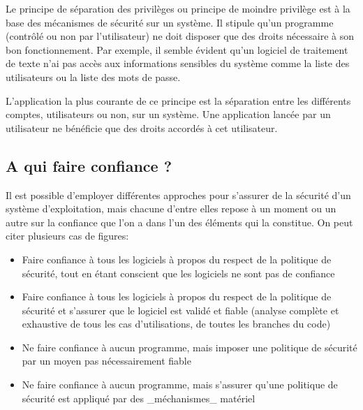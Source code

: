 Le principe de séparation des privilèges ou principe de moindre privilège est à la base des mécanismes de sécurité sur un système. Il stipule qu'un programme (contrôlé ou non par l'utilisateur) ne doit disposer que des droits nécessaire à son bon fonctionnement. Par exemple, il semble évident qu'un logiciel de traitement de texte n'ai pas accès aux informations sensibles du système comme la liste des utilisateurs ou la liste des mots de passe.

L'application la plus courante de ce principe est la séparation entre les différents comptes, utilisateurs ou non, sur un système. Une application lancée par un utilisateur ne bénéficie que des droits accordés à cet utilisateur.

\subsection{A qui faire confiance ?}

Il est possible d'employer différentes approches pour s'assurer de la sécurité d'un système d'exploitation, mais chacune d'entre elles repose à un moment ou un autre sur la confiance que l'on a dans l'un des éléments qui la constitue. On peut citer plusieurs cas de figures\cite{WCS}:
\begin{itemize}
  \item Faire confiance à tous les logiciels à propos du respect de la politique de sécurité, tout en étant conscient que les logiciels ne sont pas de confiance %
  \item Faire confiance à tous les logiciels à propos du respect de la politique de sécurité et s'assurer que le logiciel est validé et fiable (analyse complète et exhaustive de tous les cas d'utilisations, de toutes les branches du code) %
  \item Ne faire confiance à aucun programme, mais imposer une politique de sécurité par un moyen pas nécessairement fiable%
  \item Ne faire confiance à aucun programme, mais s'assurer qu'une politique de sécurité est appliqué par des \_méchanismes\_ matériel%

\end{itemize}


